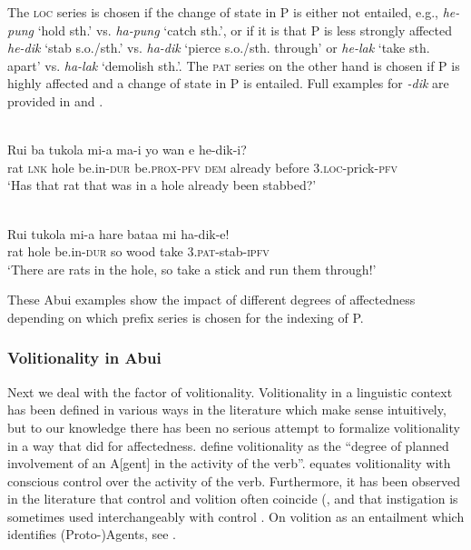The \textsc{loc} series is chosen if the change of state in P is either not entailed, e.g., \textit{he-pung} `hold sth.' vs. \textit{ha-pung} `catch sth.', or if it is that P is less strongly affected \textit{he-dik} `stab s.o./sth.' vs. \textit{ha-dik} `pierce s.o./sth. through' or \textit{he-lak} `take sth. apart' vs. \textit{ha-lak} `demolish sth.'. The \textsc{pat} series on the other hand is chosen if P is highly affected and a change of state in P is entailed. Full examples for \textit{{}-dik} are provided in  and .


\ea%
\label{bkm:Ref383697370}
 \\ 
\gll  Rui  ba  tukola  mi-a  ma-i  yo  wan  e  he-dik-i?      \\  
   rat  \textsc{lnk} hole  be.in-\textsc{dur} be.\textsc{prox-pfv} \textsc{dem}  already    before  3.\textsc{loc}{}-prick-\textsc{pfv} \\
\glt `Has that rat that was in a hole already been stabbed?'
\z
  


\ea%
\label{bkm:Ref383697375}
 \\ 
\gll   Rui  tukola  mi-a  hare  bataa    mi  ha-dik-e! \\  
    rat  hole  be.in-\textsc{dur} so  wood  take  3.\textsc{pat}{}-stab-\textsc{ipfv} \\
\glt  `There are rats in the hole, so take a stick and run them through!'
\z



 



These Abui  examples show the impact of different degrees of affectedness depending on which prefix series is chosen for the indexing of P.

\clearpage
\subsubsection{Volitionality in Abui} 
Next we deal with the factor of volitionality. Volitionality in a linguistic context has been defined in various ways in the literature which make sense intuitively, but to our knowledge there has been no serious attempt to formalize volitionality in a way that \citet{Beavers2011} did for affectedness. \citet[286]{HopperEtAl1980} define volitionality as the ``degree of planned involvement of an A[gent] in the activity of the verb''. \citet[52]{DeLancey1985} equates volitionality with conscious control over the activity of the verb. Furthermore, it has been observed in the literature that control and volition often coincide (\citet[392]{Tsunoda1985},\citet[56]{DeLancey1985} and that instigation is sometimes used interchangeably with control \citep[45]{Naess2007}. On volition as an entailment which identifies (Proto-)Agents, see \citet{Dowty1991}.

